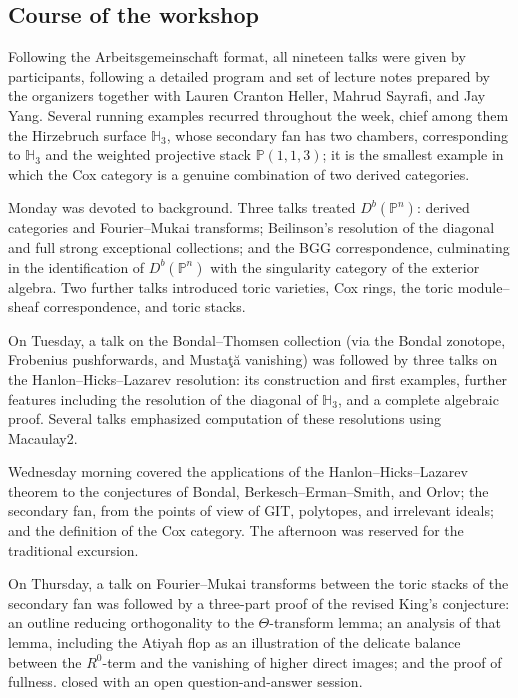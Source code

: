 \documentclass{amsart}
\newcommand{\PP}{\mathbb{P}}
\newcommand{\Db}{D^{b}}
\begin{document}
\subsection*{Course of the workshop}
Following the Arbeitsgemeinschaft format, all nineteen talks were given by participants,
following a detailed program and set of lecture notes prepared by the organizers together
with Lauren Cranton Heller, Mahrud Sayrafi, and Jay Yang. Several running examples
recurred throughout the week, chief among them the Hirzebruch surface $\mathbb{H}_3$,
whose secondary fan has two chambers, corresponding to $\mathbb{H}_3$ and the weighted
projective stack $\PP(1,1,3)$; it is the smallest example in which the Cox category is a
genuine combination of two derived categories.

Monday was devoted to background. Three talks treated $\Db(\PP^n)$: derived categories
and Fourier--Mukai transforms; Beilinson's resolution of the diagonal and full strong
exceptional collections; and the BGG correspondence, culminating in the identification of
$\Db(\PP^n)$ with the singularity category of the exterior algebra. Two further talks
introduced toric varieties, Cox rings, the toric module--sheaf correspondence, and toric stacks.

On Tuesday, a talk on the Bondal--Thomsen collection (via the Bondal zonotope, Frobenius
pushforwards, and Musta\c{t}\u{a} vanishing) was followed by three talks on the
Hanlon--Hicks--Lazarev resolution: its construction and first examples, further features
including the resolution of the diagonal of $\mathbb{H}_3$, and a complete algebraic
proof. Several talks emphasized computation of these resolutions using Macaulay2. 

Wednesday morning covered the applications of the Hanlon--Hicks--Lazarev theorem to the
conjectures of Bondal, Berkesch--Erman--Smith, and Orlov; the secondary fan, from the
points of view of GIT, polytopes, and irrelevant ideals; and the definition of the Cox
category. The afternoon was reserved for the traditional excursion.

On Thursday, a talk on Fourier--Mukai transforms between the toric stacks of the secondary
fan was followed by a three-part proof of the revised King's conjecture: an outline
reducing orthogonality to the $\Theta$-transform lemma; an analysis of that lemma,
including the Atiyah flop as an illustration of the delicate balance between the
$R^0$-term and the vanishing of higher direct images; and the proof of fullness. %
closed with an open question-and-answer session.
\end{document}

